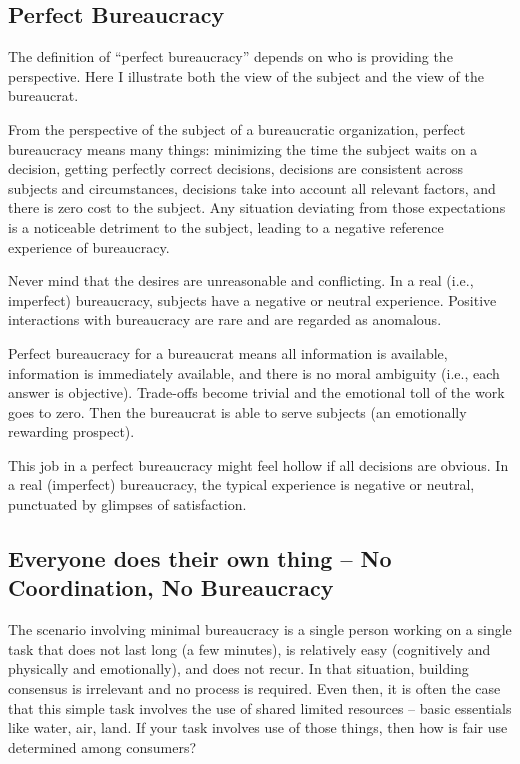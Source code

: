\subsection*{Perfect Bureaucracy}

The definition of ``perfect bureaucracy'' depends on who is providing the perspective. Here I illustrate both the view of the subject and the view of the bureaucrat. 

From the perspective of the subject of a bureaucratic organization, perfect bureaucracy means many things: minimizing the time the subject waits on a decision, getting perfectly correct decisions, decisions are consistent across subjects and circumstances, decisions take into account all relevant factors, and there is zero cost to the subject. Any situation deviating from those expectations is a noticeable detriment to the subject, leading to a negative reference experience of bureaucracy. 

Never mind that the desires are unreasonable and conflicting. In a real (i.e., imperfect) bureaucracy, subjects have a negative or neutral experience. Positive interactions with bureaucracy are rare and are regarded as anomalous.

Perfect bureaucracy for a bureaucrat means all information is available, information is immediately available, and there is no moral ambiguity (i.e., each answer is objective). Trade-offs become trivial and the emotional toll of the work goes to zero. Then the bureaucrat is able to serve subjects (an emotionally rewarding prospect). 

This job in a perfect bureaucracy might feel hollow if all decisions are obvious. In a real (imperfect) bureaucracy, the typical experience is negative or neutral, punctuated by glimpses of satisfaction. 

\subsection*{Everyone does their own thing -- No Coordination, No Bureaucracy}
The scenario involving minimal bureaucracy is a single person working on a single task that does not last long (a few minutes), is relatively easy (cognitively and physically and emotionally), and does not recur. In that situation, building consensus is irrelevant and no process is required. Even then, it is often the case that this simple task involves the use of shared limited resources -- basic essentials like water, air, land. If your task involves use of those things, then how is fair use determined among consumers?

